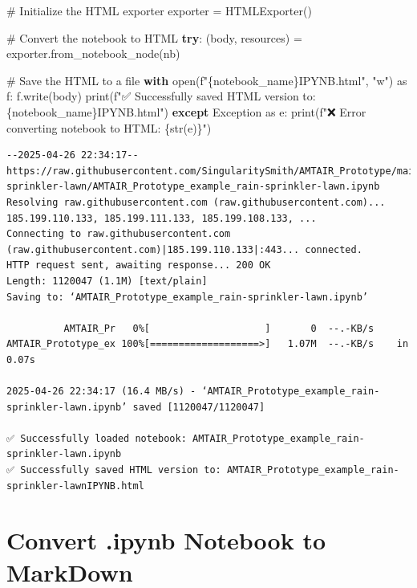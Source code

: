 \documentclass[
  11pt,
  letterpaper,
]{book}
\newenvironment{Shaded}{\begin{snugshade}}{\end{snugshade}}
\newcommand{\BuiltInTok}[1]{\textcolor[rgb]{0.00,0.23,0.31}{#1}}
\newcommand{\CommentTok}[1]{\textcolor[rgb]{0.37,0.37,0.37}{#1}}
\newcommand{\ControlFlowTok}[1]{\textcolor[rgb]{0.00,0.23,0.31}{\textbf{#1}}}
\newcommand{\ImportTok}[1]{\textcolor[rgb]{0.00,0.46,0.62}{#1}}
\newcommand{\NormalTok}[1]{\textcolor[rgb]{0.00,0.23,0.31}{#1}}
\newcommand{\OperatorTok}[1]{\textcolor[rgb]{0.37,0.37,0.37}{#1}}
\newcommand{\PreprocessorTok}[1]{\textcolor[rgb]{0.68,0.00,0.00}{#1}}
\newcommand{\SpecialCharTok}[1]{\textcolor[rgb]{0.37,0.37,0.37}{#1}}
\newcommand{\SpecialStringTok}[1]{\textcolor[rgb]{0.13,0.47,0.30}{#1}}
\newcommand{\StringTok}[1]{\textcolor[rgb]{0.13,0.47,0.30}{#1}}
\begin{document}
\begin{Shaded}
\begin{Highlighting}[]
\CommentTok{\# Initialize the HTML exporter}
\NormalTok{exporter }\OperatorTok{=}\NormalTok{ HTMLExporter()}

\CommentTok{\# Convert the notebook to HTML}
\ControlFlowTok{try}\NormalTok{:}
\NormalTok{    (body, resources) }\OperatorTok{=}\NormalTok{ exporter.from\_notebook\_node(nb)}

    \CommentTok{\# Save the HTML to a file}
    \ControlFlowTok{with} \BuiltInTok{open}\NormalTok{(}\SpecialStringTok{f"}\SpecialCharTok{\{}\NormalTok{notebook\_name}\SpecialCharTok{\}}\SpecialStringTok{IPYNB.html"}\NormalTok{, }\StringTok{"w"}\NormalTok{) }\ImportTok{as}\NormalTok{ f:}
\NormalTok{        f.write(body)}
    \BuiltInTok{print}\NormalTok{(}\SpecialStringTok{f"✅ Successfully saved HTML version to: }\SpecialCharTok{\{}\NormalTok{notebook\_name}\SpecialCharTok{\}}\SpecialStringTok{IPYNB.html"}\NormalTok{)}
\ControlFlowTok{except} \PreprocessorTok{Exception} \ImportTok{as}\NormalTok{ e:}
    \BuiltInTok{print}\NormalTok{(}\SpecialStringTok{f"❌ Error converting notebook to HTML: }\SpecialCharTok{\{}\BuiltInTok{str}\NormalTok{(e)}\SpecialCharTok{\}}\SpecialStringTok{"}\NormalTok{)}
\end{Highlighting}
\end{Shaded}

\begin{verbatim}
--2025-04-26 22:34:17--  https://raw.githubusercontent.com/SingularitySmith/AMTAIR_Prototype/main/data/example_rain-sprinkler-lawn/AMTAIR_Prototype_example_rain-sprinkler-lawn.ipynb
Resolving raw.githubusercontent.com (raw.githubusercontent.com)... 185.199.110.133, 185.199.111.133, 185.199.108.133, ...
Connecting to raw.githubusercontent.com (raw.githubusercontent.com)|185.199.110.133|:443... connected.
HTTP request sent, awaiting response... 200 OK
Length: 1120047 (1.1M) [text/plain]
Saving to: ‘AMTAIR_Prototype_example_rain-sprinkler-lawn.ipynb’

          AMTAIR_Pr   0%[                    ]       0  --.-KB/s               AMTAIR_Prototype_ex 100%[===================>]   1.07M  --.-KB/s    in 0.07s   

2025-04-26 22:34:17 (16.4 MB/s) - ‘AMTAIR_Prototype_example_rain-sprinkler-lawn.ipynb’ saved [1120047/1120047]

✅ Successfully loaded notebook: AMTAIR_Prototype_example_rain-sprinkler-lawn.ipynb
✅ Successfully saved HTML version to: AMTAIR_Prototype_example_rain-sprinkler-lawnIPYNB.html
\end{verbatim}

\section{Convert .ipynb Notebook to
MarkDown}\label{convert-.ipynb-notebook-to-markdown}
\end{document}
